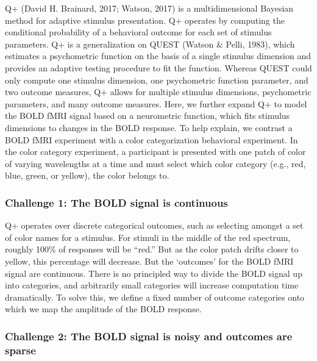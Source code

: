 \documentclass[
  man,floatsintext]{apa6}
\begin{document}
Q+ (David H. Brainard, 2017; Watson, 2017) is a multidimensional Bayesian method for adaptive stimulus presentation. Q+ operates by computing the conditional probability of a behavioral outcome for each set of stimulus parameters. Q+ is a generalization on QUEST (Watson \& Pelli, 1983), which estimates a psychometric function on the basis of a single stimulus dimension and provides an adaptive testing procedure to fit the function. Whereas QUEST could only compute one stimulus dimension, one psychometric function parameter, and two outcome measures, Q+ allows for multiple stimulus dimensions, psychometric parameters, and many outcome measures. Here, we further expand Q+ to model the BOLD fMRI signal based on a neurometric function, which fits stimulus dimensions to changes in the BOLD response. To help explain, we contrast a BOLD fMRI experiment with a color categorization behavioral experiment. In the color category experiment, a participant is presented with one patch of color of varying wavelengths at a time and must select which color category (e.g., red, blue, green, or yellow), the color belongs to.

\hypertarget{challenge-1-the-bold-signal-is-continuous}{%
\subsubsection{Challenge 1: The BOLD signal is continuous}\label{challenge-1-the-bold-signal-is-continuous}}

Q+ operates over discrete categorical outcomes, such as selecting amongst a set of color names for a stimulus. For stimuli in the middle of the red spectrum, roughly 100\% of responses will be ``red.'' But as the color patch drifts closer to yellow, this percentage will decrease. But the `outcomes' for the BOLD fMRI signal are continuous. There is no principled way to divide the BOLD signal up into categories, and arbitrarily small categories will increase computation time dramatically. To solve this, we define a fixed number of outcome categories onto which we map the amplitude of the BOLD response.

\hypertarget{challenge-2-the-bold-signal-is-noisy-and-outcomes-are-sparse}{%
\subsubsection{Challenge 2: The BOLD signal is noisy and outcomes are sparse}\label{challenge-2-the-bold-signal-is-noisy-and-outcomes-are-sparse}}
\end{document}
